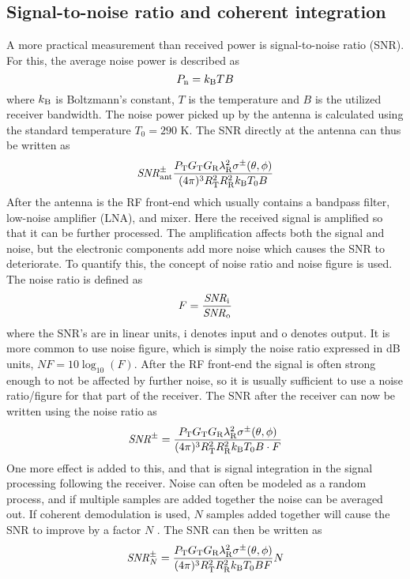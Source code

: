 \documentclass[11pt,twoside]{eitExjobb}
\begin{document}
	\subsection{Signal-to-noise ratio and coherent integration \label{sec:app-derivations-radar-SNR}}
	A more practical measurement than received power is signal-to-noise ratio (SNR). For this, the average noise power is described as \cite{Young2004}
	\begin{equation*}
		P_{\mathrm{n}} = k_{\mathrm{B}} TB
	\end{equation*}
	where $k_{\mathrm{B}}$ is Boltzmann's constant, $T$ is the temperature and $B$ is the utilized receiver bandwidth. The noise power picked up by the antenna is calculated using the standard temperature $T_0 = 290$ K. The SNR directly at the antenna can thus be written as
	\begin{equation*}
		\mathit{SNR}^\pm_{\mathrm{ant}} \frac{P_{\mathrm{T}} G_{\mathrm{T}} G_{\mathrm{R}} \lambda_{\mathrm{R}}^2 \sigma^\pm (\theta,\phi)}{(4\pi)^3 R_{\mathrm{T}}^2 R_{\mathrm{R}}^2 k_{\mathrm{B}} T_0 B}
	\end{equation*}
	After the antenna is the RF front-end which usually contains a bandpass filter, low-noise amplifier (LNA), and mixer. Here the received signal is amplified so that it can be further processed. The amplification affects both the signal and noise, but the electronic components add more noise which causes the SNR to deteriorate. To quantify this, the concept of noise ratio and noise figure is used. The noise ratio is defined as \cite{Young2004}
	\begin{equation*}
		F = \frac{\mathit{SNR}_{\mathrm{i}}}{\mathit{SNR}_{\mathrm{o}}}
	\end{equation*}
	where the SNR's are in linear units, i denotes input and o denotes output. It is more common to use noise figure, which is simply the noise ratio expressed in dB units, $\mathit{NF} = 10\log_{10}(F)$. After the RF front-end the signal is often strong enough to not be affected by further noise, so it is usually sufficient to use a noise ratio/figure for that part of the receiver. The SNR after the receiver can now be written using the noise ratio as
	\begin{equation*}
		\mathit{SNR}^\pm = \frac{P_{\mathrm{T}} G_{\mathrm{T}} G_{\mathrm{R}} \lambda_{\mathrm{R}}^2 \sigma^\pm (\theta,\phi)}{(4\pi)^3 R_{\mathrm{T}}^2 R_{\mathrm{R}}^2 k_{\mathrm{B}} T_0 B \cdot F}
	\end{equation*}
	One more effect is added to this, and that is signal integration in the signal processing following the receiver. Noise can often be modeled as a random process, and if multiple samples are added together the noise can be averaged out. If coherent demodulation is used, $N$ samples added together will cause the SNR to improve by a factor $N$ \cite{Richards2012}. The SNR can then be written as
	\begin{equation*}
		\mathit{SNR}^\pm_N = \frac{P_{\mathrm{T}} G_{\mathrm{T}} G_{\mathrm{R}} \lambda_{\mathrm{R}}^2 \sigma^\pm (\theta,\phi)}{(4\pi)^3 R_{\mathrm{T}}^2 R_{\mathrm{R}}^2 k_{\mathrm{B}} T_0 B F} N
	\end{equation*}
	
\end{document}
